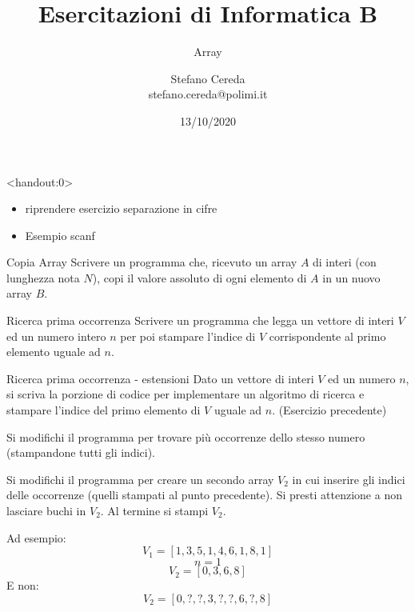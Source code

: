 \documentclass[aspectratio=169,]{beamer}
\title{Esercitazioni di Informatica B}
\subtitle{Array}
\author{Stefano Cereda\\
	stefano.cereda@polimi.it
}
\date{13/10/2020}
\begin{document}
\begin{frame}
    \maketitle
\end{frame}

	\begin{frame}<handout:0>{}
        \begin{itemize}
            \item riprendere esercizio separazione in cifre
            \item Esempio scanf
        \end{itemize}
	\end{frame}

\begin{frame}{Copia Array}
Scrivere un programma che, ricevuto un array $A$ di interi (con lunghezza nota $N$), copi il valore assoluto di ogni elemento di $A$ in un nuovo array $B$.
\end{frame}

%
%
%

\begin{frame}{Ricerca prima occorrenza}
Scrivere un programma che legga un vettore di interi $V$ ed un numero intero $n$ per poi stampare l'indice di $V$ corrispondente al primo elemento uguale ad $n$.
\end{frame}

\begin{frame}{Ricerca prima occorrenza - estensioni}
\footnotesize
Dato un vettore di interi $V$ ed un numero $n$, si scriva la porzione di codice per implementare un algoritmo di ricerca e stampare l'indice del primo elemento di $V$ uguale ad $n$. (Esercizio precedente)

Si modifichi il programma per trovare più occorrenze dello stesso numero (stampandone tutti gli indici).

\pause
Si modifichi il programma per creare un secondo array $V_2$ in cui inserire gli indici delle occorrenze (quelli stampati al punto precedente). Si presti attenzione a non lasciare buchi in $V_2$. Al termine si stampi $V_2$.

\pause
Ad esempio:
\[ V_1 = [1, 3, 5, 1, 4, 6, 1, 8, 1] \]
\[ n=1 \]
\[ V_2 = [0, 3, 6, 8]\]
E non:
\[ V_2 = [0, ?, ?, 3, ?, ?, 6, ?, 8]\]
\end{frame}
\end{document}
